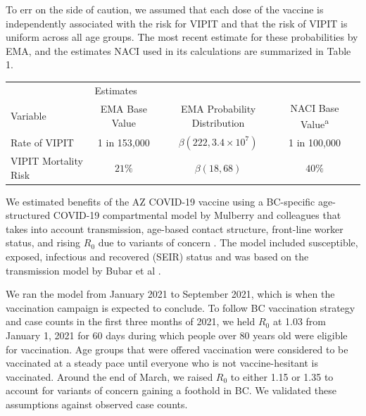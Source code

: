 \documentclass[]{interact}
\theoremstyle{plain}%
\theoremstyle{definition}
\theoremstyle{remark}
\begin{document}
To err on the side of caution, we assumed that each dose of the vaccine
is independently associated with the risk for VIPIT and that the risk of
VIPIT is uniform across all age groups. The most recent estimate for
these probabilities by EMA, and the estimates NACI used in its
calculations are summarized in Table 1.

\begin{table}
{\begin{tabular}{lcccc} \toprule
 & \multicolumn{2}{l}{Estimates} \\ \cmidrule{2-4}
 Variable & EMA Base Value & EMA Probability Distribution & NACI Base Value\textsuperscript{a}  \\ \midrule
 Rate of VIPIT & 1 in 153,000 & $\beta(222, 3.4\times 10^7)$ & 1 in 100,000 \\
 VIPIT Mortality Risk & $21\%$ &  $\beta(18, 68)$ & $40\%$ \\ \bottomrule 
\end{tabular}}
\label{harm-param}
\end{table}

We estimated benefits of the AZ COVID-19 vaccine using a BC-specific
age-structured COVID-19 compartmental model by Mulberry and colleagues
that takes into account transmission, age-based contact structure,
front-line worker status, and rising \(R_0\) due to variants of concern
\citep{mulberry_vaccine_2021}. The model included susceptible, exposed,
infectious and recovered (SEIR) status and was based on the transmission
model by Bubar et al \citep{bubar_model-informed_2021}.

We ran the model from January 2021 to September 2021, which is when the
vaccination campaign is expected to conclude. To follow BC vaccination
strategy and case counts in the first three months of 2021, we held
\(R_0\) at 1.03 from January 1, 2021 for 60 days during which people
over 80 years old were eligible for vaccination. Age groups that were
offered vaccination were considered to be vaccinated at a steady pace
until everyone who is not vaccine-hesitant is vaccinated. Around the end
of March, we raised \(R_0\) to either 1.15 or 1.35 to account for
variants of concern gaining a foothold in BC. We validated these
assumptions against observed case counts.
\end{document}
